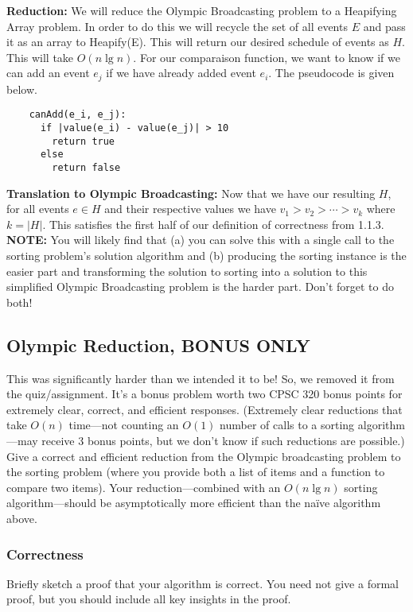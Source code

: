 \documentclass[11pt, oneside]{article}   	%
\theoremstyle{definition}
\theoremstyle{remark}
\begin{document}
\textbf{Reduction: } We will reduce the Olympic Broadcasting problem to a Heapifying Array problem. In order to do this we will recycle the set of all events $E$ and pass it as an array to Heapify(E). This will return our desired schedule of events as $H$. This will take $O(n \lg n)$. For our comparaison function, we want to know if we can add an event $e_j$ if we have already added event $e_i$. The pseudocode is given below.
\begin{verbatim}
	canAdd(e_i, e_j):
	  if |value(e_i) - value(e_j)| > 10
	    return true
	  else
	    return false	
\end{verbatim} 
\textbf{Translation to Olympic Broadcasting: } Now that we have our resulting $H$, for all events $e \in H$ and their respective values we have $v_1 > v_2 > \dotsm> v_k$ where $k =|H|$. This satisfies the first half of our definition of correctness from 1.1.3. 
\textbf{NOTE:} You will likely find that (a) you can solve this with a single
call to the sorting problem's solution algorithm and (b) producing the
sorting instance is the easier part and transforming the solution to
sorting into a solution to this simplified Olympic Broadcasting
problem is the harder part. Don't forget to do both!

\subsection{Olympic Reduction, BONUS ONLY}
This was significantly harder than we intended it to be! So, we
removed it from the quiz/assignment. It's a bonus problem worth two
CPSC 320 bonus points for extremely clear, correct, and efficient
responses. (Extremely clear reductions that take $O(n)$ time---not
counting an $O(1)$ number of calls to a sorting algorithm---may
receive 3 bonus points, but we don't know if such reductions are
possible.)
Give a correct and efficient reduction from the Olympic broadcasting
problem to the sorting problem (where you provide both a list of items
and a function to compare two items). Your reduction---combined with
an $O(n \lg n)$ sorting algorithm---should be asymptotically more
efficient than the na\"ive algorithm above.

\subsubsection{Correctness}
Briefly sketch a proof that your algorithm is correct. You need not
give a formal proof, but you should include all key insights in the
proof.
\end{document}
